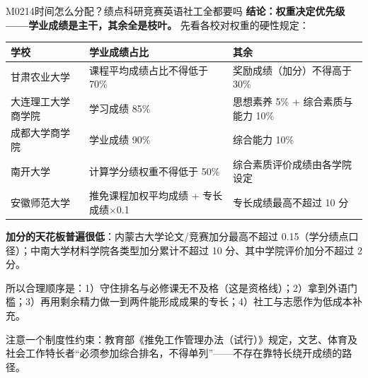 \begin{qa}{M0214}{时间怎么分配？绩点科研竞赛英语社工全都要吗}
\textbf{结论：权重决定优先级——学业成绩是主干，其余全是枝叶。} 先看各校对权重的硬性规定：

\par\vspace{2pt}\nobreak\begin{center}\footnotesize
\begin{tabularx}{\textwidth}{>{\raggedright\arraybackslash}X>{\raggedright\arraybackslash}X>{\raggedright\arraybackslash}X}
\toprule
\textbf{学校} & \textbf{学业成绩占比} & \textbf{其余} \\ \midrule
甘肃农业大学 & 课程平均成绩占比不得低于 70\% & 奖励成绩（加分）不得高于 30\% \\
大连理工大学商学院 & 学习成绩 85\% & 思想素养 5\% + 综合素质与能力 10\% \\
成都大学商学院 & 学业成绩 90\% & 综合能力 10\% \\
南开大学 & 计算学分绩权重不得低于 50\% & 综合素质评价成绩由各学院设定 \\
安徽师范大学 & 推免课程加权平均成绩 + 专长成绩×0.1 & 专长成绩最高不超过 10 分 \\
\bottomrule
\end{tabularx}
\end{center}\vspace{2pt}\par

\textbf{加分的天花板普遍很低}：内蒙古大学论文/竞赛加分最高不超过 0.15（学分绩点口径）；中南大学材料学院各类型加分累计不超过 10 分、其中学院评价加分不超过 2 分。

所以合理顺序是：1）守住排名与必修课无不及格（这是资格线）；2）拿到外语门槛；3）再用剩余精力做一到两件能形成成果的专长；4）社工与志愿作为低成本补充。

注意一个制度性约束：教育部《推免工作管理办法（试行）》规定，文艺、体育及社会工作特长者“必须参加综合排名，不得单列”——不存在靠特长绕开成绩的路径。
\end{qa}

